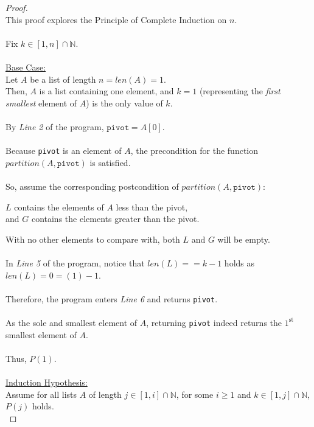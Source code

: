 \documentclass[12pt]{article}
\begin{document}
\begin{proof}
\leavevmode\\
    This proof explores the Principle of Complete Induction on $n$. \\
    \\
    Fix $k \in [1, n] \cap \mathbb{N}$. \\
    \\
    \underline{Base Case:} \\
    Let $A$ be a list of length $n = len(A) = 1$.
    \\
    Then, $A$ is a list containing one element, and $k = 1$ (representing the \textit{first smallest} element of $A$) is the only value of $k$. \\
    \\
    By \textit{Line 2} of the program, $\texttt{pivot} = A[0]$. \\
    \\
    Because \texttt{pivot} is an element of $A$, the precondition for the function $partition(A, \texttt{pivot})$ is satisfied. \\
    \\
    So, assume the corresponding postcondition of $partition(A, \texttt{pivot})$:
    \begin{center}
        $L$ contains the elements of $A$ less than the pivot, \\
        and $G$ contains the elements greater than the pivot.
    \end{center}
    With no other elements to compare with, both $L$ and $G$ will be empty. \\
    \\
    In \textit{Line 5} of the program, notice that $len(L) == k - 1$ holds as $len(L) = 0 = (1) - 1$. \\
    \\
    Therefore, the program enters \textit{Line 6} and returns \texttt{pivot}. \\
    \\
    As the sole and smallest element of $A$, returning \texttt{pivot} indeed returns the $1^{\text{st}}$ smallest element of $A$. \\
    \\
    Thus, $P(1)$. \\
    \\
    \underline{Induction Hypothesis:} \\
    Assume for all lists $A$ of length $j \in [1, i] \cap \mathbb{N}$, for some $i \geq 1$ and $k \in [1, j] \cap \mathbb{N}$, $P(j)$ holds. \\

\end{proof}
\end{document}
